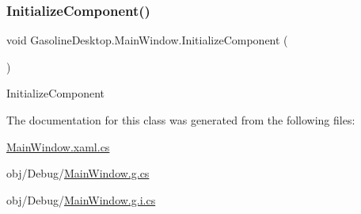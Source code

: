 \subsubsection{\texorpdfstring{InitializeComponent()}{InitializeComponent()}\hspace{0.1cm}{\footnotesize\ttfamily [2/2]}}
{\footnotesize\ttfamily void Gasoline\+Desktop.\+Main\+Window.\+Initialize\+Component (\begin{DoxyParamCaption}{ }\end{DoxyParamCaption})}



Initialize\+Component 



The documentation for this class was generated from the following files\+:\begin{DoxyCompactItemize}
\item 
\mbox{\hyperlink{_main_window_8xaml_8cs}{Main\+Window.\+xaml.\+cs}}\item 
obj/\+Debug/\mbox{\hyperlink{_main_window_8g_8cs}{Main\+Window.\+g.\+cs}}\item 
obj/\+Debug/\mbox{\hyperlink{_main_window_8g_8i_8cs}{Main\+Window.\+g.\+i.\+cs}}\end{DoxyCompactItemize}
